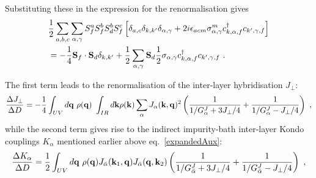 \documentclass[%
reprint,
superscriptaddress,
groupedaddress,
superscriptaddress,
onecolumn,
10pt
]{revtex4-2}
\begin{document}
Substituting these in the expression for the renormalisation gives
\begin{equation}\begin{aligned}
	&\frac{1}{2}\sum_{a,b,c} \sum_{\alpha,\gamma} S_f^a S_f^b S_d^b S_f^c \left[\delta_{a,c}\delta_{k,k^\prime}\delta_{\alpha,\gamma} + 2i \epsilon_{acm} \sigma^m_{\alpha,\gamma}c^\dagger_{k,\alpha,f} c_{k^\prime,\gamma,f}\right]\\
	&= -\frac{1}{4}{\bf S}_f \cdot {\bf S}_d \delta_{k,k^\prime} + \frac{1}{2} \sum_{\alpha,\gamma} {\bf S}_d \frac{1}{2}{\bf \sigma}_{\alpha,\gamma}c^\dagger_{k,\alpha,f} c_{k^\prime,\gamma,f}~.
\end{aligned}\end{equation}

The first term leads to the renormalisation of the inter-layer hybridisation \(J_\perp\):
\begin{equation}\begin{aligned}\label{perpRenormalisation}
	\frac{\Delta J_\perp}{\Delta D} = -\frac{1}{4}\int_{UV} d{\bf q} ~\rho({\bf q})~\int_{IR} d{\bf k} \rho({\bf k}) \sum_\alpha J_\alpha({\bf k}, {\bf q})^2\left(\frac{1}{1/G_\alpha^J + 3J_\perp/4} + \frac{1}{1/G_\alpha^J - J_\perp/4}\right)~,
\end{aligned}\end{equation}
while the second term gives rise to the indirect impurity-bath inter-layer Kondo couplings \(K_\alpha\) mentioned earlier above eq.~\ref{expandedAux}:
\begin{equation}\begin{aligned}\label{indirectRenormalisation}
	\frac{\Delta K_\alpha}{\Delta D} = \frac{1}{2}\int_{UV} d{\bf q} ~\rho({\bf q}) J_{\bar\alpha}({\bf k}_1, {\bf q})J_{\bar\alpha}({\bf q}, {\bf k}_2) \left(\frac{1}{1/G_{\bar\alpha}^J + 3J_\perp/4} + \frac{1}{1/G_{\bar\alpha}^J - J_\perp/4}\right)~,
\end{aligned}\end{equation}
\end{document}
